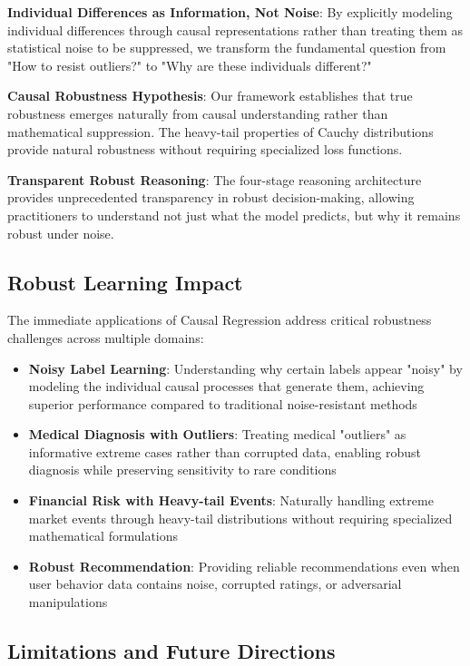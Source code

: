 \documentclass[conference]{IEEEtran}
\begin{document}
\textbf{Individual Differences as Information, Not Noise}: By explicitly modeling individual differences through causal representations rather than treating them as statistical noise to be suppressed, we transform the fundamental question from "How to resist outliers?" to "Why are these individuals different?"

\textbf{Causal Robustness Hypothesis}: Our framework establishes that true robustness emerges naturally from causal understanding rather than mathematical suppression. The heavy-tail properties of Cauchy distributions provide natural robustness without requiring specialized loss functions.

\textbf{Transparent Robust Reasoning}: The four-stage reasoning architecture provides unprecedented transparency in robust decision-making, allowing practitioners to understand not just what the model predicts, but why it remains robust under noise.

\subsection{Robust Learning Impact}

The immediate applications of Causal Regression address critical robustness challenges across multiple domains:

\begin{itemize}
\item \textbf{Noisy Label Learning}: Understanding why certain labels appear "noisy" by modeling the individual causal processes that generate them, achieving superior performance compared to traditional noise-resistant methods
\item \textbf{Medical Diagnosis with Outliers}: Treating medical "outliers" as informative extreme cases rather than corrupted data, enabling robust diagnosis while preserving sensitivity to rare conditions
\item \textbf{Financial Risk with Heavy-tail Events}: Naturally handling extreme market events through heavy-tail distributions without requiring specialized mathematical formulations
\item \textbf{Robust Recommendation}: Providing reliable recommendations even when user behavior data contains noise, corrupted ratings, or adversarial manipulations
\end{itemize}

\subsection{Limitations and Future Directions}
\end{document}

